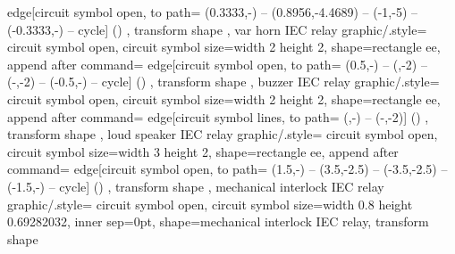 {{{      \bgroup
        edge[circuit symbol open, to path={%
          (0.3333\tikzcircuitssizeunit,-\tikzcircuitssizeunit) --  (0.8956\tikzcircuitssizeunit,-4.4689\tikzcircuitssizeunit)  --  (-1\tikzcircuitssizeunit,-5\tikzcircuitssizeunit)  --  (-0.3333\tikzcircuitssizeunit,-\tikzcircuitssizeunit) -- cycle}] ()
      \egroup%
    },
    transform shape
  },
  var horn IEC relay graphic/.style={
    circuit symbol open,
    circuit symbol size=width 2 height 2,
    shape=rectangle ee,
    append after command={%
      \bgroup
        edge[circuit symbol open, to path={%
          (0.5\tikzcircuitssizeunit,-\tikzcircuitssizeunit) --  (\tikzcircuitssizeunit,-2\tikzcircuitssizeunit)  --  (-\tikzcircuitssizeunit,-2\tikzcircuitssizeunit)  --  (-0.5\tikzcircuitssizeunit,-\tikzcircuitssizeunit) -- cycle}] ()
      \egroup%
    },
    transform shape
  },
  buzzer IEC relay graphic/.style={
    circuit symbol open,
    circuit symbol size=width 2 height 2,
    shape=rectangle ee,
    append after command={%
      \bgroup
        edge[circuit symbol lines, to path={%
          (\tikzcircuitssizeunit,-\tikzcircuitssizeunit) --  (-\tikzcircuitssizeunit,-2\tikzcircuitssizeunit)}] ()
      \egroup%
    },
    transform shape
  },
  loud speaker IEC relay graphic/.style={
    circuit symbol open,
    circuit symbol size=width 3 height 2,
    shape=rectangle ee,
    append after command={%
      \bgroup
        edge[circuit symbol open, to path={%
          (1.5\tikzcircuitssizeunit,-\tikzcircuitssizeunit) --  (3.5\tikzcircuitssizeunit,-2.5\tikzcircuitssizeunit) --  (-3.5\tikzcircuitssizeunit,-2.5\tikzcircuitssizeunit) -- (-1.5\tikzcircuitssizeunit,-\tikzcircuitssizeunit) -- cycle}] ()
      \egroup%
    },
    transform shape
  },
  mechanical interlock IEC relay graphic/.style={
    circuit symbol open,
    circuit symbol size=width 0.8 height 0.69282032,
    inner sep=0pt,
    shape=mechanical interlock IEC relay,
    transform shape
  }
}


